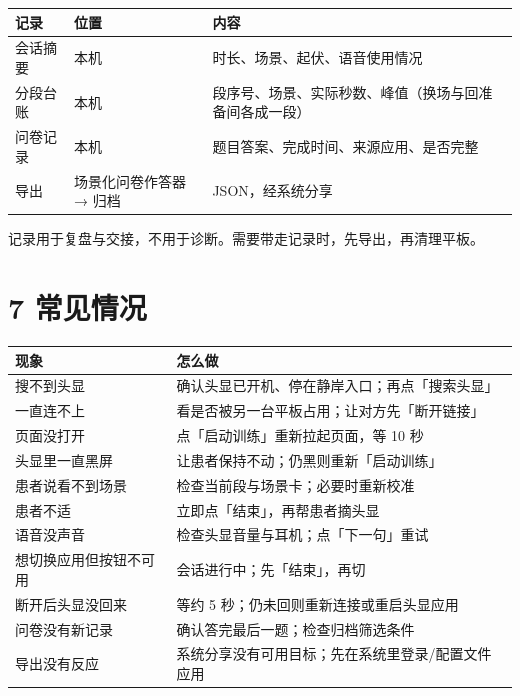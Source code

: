 \documentclass[
  chinese,
  letterpaper,
  DIV=11,
  numbers=noendperiod]{scrartcl}
\newcounter{none} %
\begin{document}
{\def\LTcaptype{none} %
\begin{longtable}[]{@{}
  >{\raggedright\arraybackslash}p{}
  >{\raggedright\arraybackslash}p{}
  >{\raggedright\arraybackslash}p{}@{}}
\toprule\noalign{}
\begin{minipage}[b]{\linewidth}\raggedright
记录
\end{minipage} & \begin{minipage}[b]{\linewidth}\raggedright
位置
\end{minipage} & \begin{minipage}[b]{\linewidth}\raggedright
内容
\end{minipage} \\
\midrule\noalign{}
\endhead
\bottomrule\noalign{}
\endlastfoot
会话摘要 & 本机 & 时长、场景、起伏、语音使用情况 \\
分段台账 & 本机 &
段序号、场景、实际秒数、峰值（换场与回准备间各成一段） \\
问卷记录 & 本机 & 题目答案、完成时间、来源应用、是否完整 \\
导出 & 场景化问卷作答器 → 归档 & JSON，经系统分享 \\
\end{longtable}
}

记录用于复盘与交接，不用于诊断。需要带走记录时，先导出，再清理平板。

\section{7 常见情况}\label{ux5e38ux89c1ux60c5ux51b5}

{\def\LTcaptype{none} %
\begin{longtable}[]{@{}ll@{}}
\toprule\noalign{}
现象 & 怎么做 \\
\midrule\noalign{}
\endhead
\bottomrule\noalign{}
\endlastfoot
搜不到头显 & 确认头显已开机、停在静岸入口；再点「搜索头显」 \\
一直连不上 & 看是否被另一台平板占用；让对方先「断开链接」 \\
页面没打开 & 点「启动训练」重新拉起页面，等 10 秒 \\
头显里一直黑屏 & 让患者保持不动；仍黑则重新「启动训练」 \\
患者说看不到场景 & 检查当前段与场景卡；必要时重新校准 \\
患者不适 & 立即点「结束」，再帮患者摘头显 \\
语音没声音 & 检查头显音量与耳机；点「下一句」重试 \\
想切换应用但按钮不可用 & 会话进行中；先「结束」，再切 \\
断开后头显没回来 & 等约 5 秒；仍未回则重新连接或重启头显应用 \\
问卷没有新记录 & 确认答完最后一题；检查归档筛选条件 \\
导出没有反应 & 系统分享没有可用目标；先在系统里登录/配置文件应用 \\
\end{longtable}
}
\end{document}
